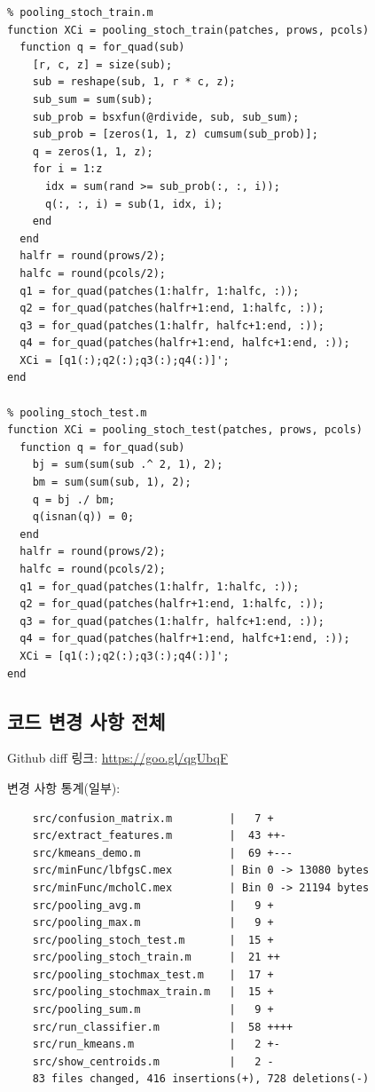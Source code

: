 \documentclass[a4paper,9pt]{article}
\begin{document}
\begin{lstlisting}
% pooling_stoch_train.m
function XCi = pooling_stoch_train(patches, prows, pcols)
  function q = for_quad(sub)
    [r, c, z] = size(sub);
    sub = reshape(sub, 1, r * c, z);
    sub_sum = sum(sub);
    sub_prob = bsxfun(@rdivide, sub, sub_sum);
    sub_prob = [zeros(1, 1, z) cumsum(sub_prob)];
    q = zeros(1, 1, z);
    for i = 1:z
      idx = sum(rand >= sub_prob(:, :, i));
      q(:, :, i) = sub(1, idx, i);
    end
  end
  halfr = round(prows/2);
  halfc = round(pcols/2);
  q1 = for_quad(patches(1:halfr, 1:halfc, :));
  q2 = for_quad(patches(halfr+1:end, 1:halfc, :));
  q3 = for_quad(patches(1:halfr, halfc+1:end, :));
  q4 = for_quad(patches(halfr+1:end, halfc+1:end, :));
  XCi = [q1(:);q2(:);q3(:);q4(:)]';
end

% pooling_stoch_test.m
function XCi = pooling_stoch_test(patches, prows, pcols)
  function q = for_quad(sub)
    bj = sum(sum(sub .^ 2, 1), 2);
    bm = sum(sum(sub, 1), 2);
    q = bj ./ bm;
    q(isnan(q)) = 0;
  end
  halfr = round(prows/2);
  halfc = round(pcols/2);
  q1 = for_quad(patches(1:halfr, 1:halfc, :));
  q2 = for_quad(patches(halfr+1:end, 1:halfc, :));
  q3 = for_quad(patches(1:halfr, halfc+1:end, :));
  q4 = for_quad(patches(halfr+1:end, halfc+1:end, :));
  XCi = [q1(:);q2(:);q3(:);q4(:)]';
end
\end{lstlisting}

\subsection*{코드 변경 사항 전체}

Github diff 링크: \url{https://goo.gl/qgUbqF}

변경 사항 통계(일부):
\begin{lstlisting}
    src/confusion_matrix.m         |   7 +
    src/extract_features.m         |  43 ++-
    src/kmeans_demo.m              |  69 +---
    src/minFunc/lbfgsC.mex         | Bin 0 -> 13080 bytes
    src/minFunc/mcholC.mex         | Bin 0 -> 21194 bytes
    src/pooling_avg.m              |   9 +
    src/pooling_max.m              |   9 +
    src/pooling_stoch_test.m       |  15 +
    src/pooling_stoch_train.m      |  21 ++
    src/pooling_stochmax_test.m    |  17 +
    src/pooling_stochmax_train.m   |  15 +
    src/pooling_sum.m              |   9 +
    src/run_classifier.m           |  58 ++++
    src/run_kmeans.m               |   2 +-
    src/show_centroids.m           |   2 -
    83 files changed, 416 insertions(+), 728 deletions(-)
\end{lstlisting}
\end{document}
